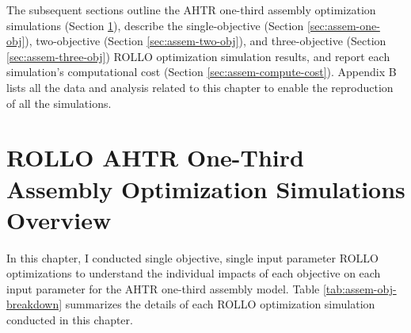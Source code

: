 The subsequent sections outline the \gls{AHTR} one-third assembly optimization 
simulations (Section \ref{sec:assem-overview}), describe the single-objective 
(Section \ref{sec:assem-one-obj}), two-objective (Section \ref{sec:assem-two-obj}), 
and three-objective (Section \ref{sec:assem-three-obj}) \gls{ROLLO} optimization 
simulation results, and report each simulation's computational cost 
(Section \ref{sec:assem-compute-cost}).
Appendix B lists all the data and analysis related to this chapter to enable the 
reproduction of all the simulations.

\section{ROLLO AHTR One-Third Assembly Optimization Simulations Overview}
\label{sec:assem-overview}
In this chapter, I conducted single objective, single input parameter 
\gls{ROLLO} optimizations to understand the individual impacts of each objective on 
each input parameter for the \gls{AHTR} one-third assembly model. 
Table \ref{tab:assem-obj-breakdown} summarizes the details of each \gls{ROLLO} 
optimization simulation conducted in this chapter.
